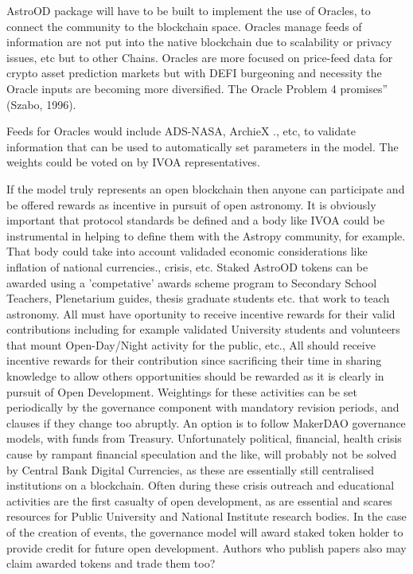 \documentclass[final,5p,times,twocolumn,authoryear]{elsarticle}
\begin{document}
AstroOD package will have to be built to implement the use of Oracles, to connect the community to the blockchain space. Oracles manage feeds of information are not put into the native blockchain due to scalability or privacy issues, etc but to other Chains.  Oracles are more focused on price-feed data for crypto asset prediction markets but with DEFI burgeoning and necessity the Oracle inputs are becoming more diversified.  The Oracle Problem 4 promises” (Szabo, 1996). 

Feeds for Oracles would include ADS-NASA, ArchieX ., etc,  to validate information that can be used to automatically set parameters in the model. The weights could be voted on by IVOA representatives.

If the  model truly represents an open blockchain then anyone can participate and be offered rewards as incentive in pursuit of open astronomy. It is obviously important that protocol standards be defined and a body like IVOA could be instrumental in helping to define them with the Astropy community, for example. That body could take into account validaded economic considerations like inflation of national currencies., crisis, etc. Staked AstroOD tokens can be awarded using a 'competative' awards scheme program to Secondary School Teachers, Plenetarium guides, thesis graduate students etc. that work to teach astronomy. All must have oportunity to receive incentive rewards for their valid contributions including for example validated University students and volunteers that mount Open-Day/Night activity for the public, etc., All should receive incentive rewards for their contribution since sacrificing their time in sharing knowledge to allow others opportunities should be rewarded as it is clearly in pursuit of Open Development. Weightings for these activities can be set periodically by the governance component with mandatory revision periods, and clauses if they change too abruptly. An option is to follow MakerDAO governance models, with funds from Treasury. Unfortunately political, financial, health  crisis cause by rampant financial speculation and the like, will probably not be solved by Central Bank Digital Currencies, as these are essentially still centralised institutions on a blockchain.  Often during these crisis outreach and educational activities are the first casualty of open development, as are essential and scares resources for Public University and National Institute research bodies. In the case of the creation of events, the governance model will award staked token holder to provide credit for future open development. Authors who publish papers also may claim awarded tokens and trade them too?
\end{document}
